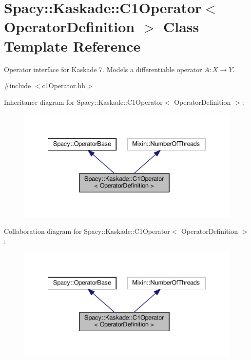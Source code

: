 \hypertarget{classSpacy_1_1Kaskade_1_1C1Operator}{\section{Spacy\-:\-:Kaskade\-:\-:C1\-Operator$<$ Operator\-Definition $>$ Class Template Reference}
\label{classSpacy_1_1Kaskade_1_1C1Operator}
}


Operator interface for Kaskade 7. Models a differentiable operator $A:X\rightarrow Y$.  




{\ttfamily \#include $<$c1\-Operator.\-hh$>$}



Inheritance diagram for Spacy\-:\-:Kaskade\-:\-:C1\-Operator$<$ Operator\-Definition $>$\-:
\nopagebreak
\begin{figure}[H]
\begin{center}
\leavevmode
\includegraphics[width=334pt]{classSpacy_1_1Kaskade_1_1C1Operator__inherit__graph}
\end{center}
\end{figure}


Collaboration diagram for Spacy\-:\-:Kaskade\-:\-:C1\-Operator$<$ Operator\-Definition $>$\-:
\nopagebreak
\begin{figure}[H]
\begin{center}
\leavevmode
\includegraphics[width=334pt]{classSpacy_1_1Kaskade_1_1C1Operator__coll__graph}
\end{center}
\end{figure}
